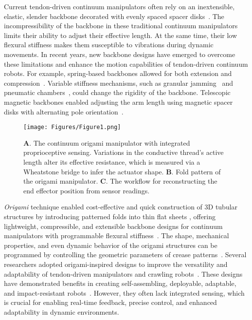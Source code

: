 \documentclass[journal, letterpaper]{IEEEtran}
\begin{document}
Current tendon-driven continuum manipulators often rely on an inextensible, elastic, slender backbone decorated with evenly spaced spacer disks~\cite{rao2021model,parvaresh2022dynamics}. The incompressibility of the backbone in these traditional continuum manipulators limits their ability to adjust their effective length. At the same time, their low flexural stiffness makes them susceptible to vibrations during dynamic movements.
In recent years, new backbone designs have emerged to overcome these limitations and enhance the motion capabilities of tendon-driven continuum robots. For example, spring-based backbones allowed for both extension and compression~\cite{li2018design}. Variable stiffness mechanisms, such as granular jamming~\cite{choi2021tendon} and pneumatic chambers~\cite{wockenfuss2022design}, could change the rigidity of the backbone.
Telescopic magnetic backbones enabled adjusting the arm length using magnetic spacer disks with alternating pole orientation~\cite{nguyen2015tendon}.

\begin{figure}[tb]
\centering
\texttt{[image: Figures/Figure1.png]}
\caption{\textbf{A}. The continuum origami manipulator with integrated proprioceptive sensing. Variations in the conductive thread's active length alter its effective resistance, which is measured via a Wheatstone bridge to infer the actuator shape. \textbf{B}. Fold pattern of the origami manipulator. \textbf{C}. The workflow for reconstructing the end effector position from sensor readings. }
\label{Fig1}
\end{figure}



\textit{Origami} technique enabled cost-effective and quick construction of 3D tubular structures by introducing patterned folds into thin flat sheets \cite{santoso2021origami}, offering lightweight, compressible, and extensible backbone designs for continuum manipulators with programmable flexural stiffness~\cite{son20224d}. 
The shape, mechanical properties, and even dynamic behavior of the origami structures can be programmed by controlling the geometric parameters of crease patterns~\cite{rus2018design,zhai2018origami}.
Several researchers adopted origami-inspired designs to improve the versatility and adaptability of tendon-driven manipulators and crawling robots~\cite{junfeng2024modular,yoo2023design,santoso2021origami,zhang2022design,zhang2023bioinspired,zhang2024origami, parvaresh2024metamaterial}. 
These designs have demonstrated benefits in creating self-assembling, deployable, adaptable, and impact-resistant robots~\cite{morgan2016approach}. However, they often lack integrated sensing, which is crucial for enabling real-time feedback, precise control, and enhanced adaptability in dynamic environments. 
\end{document}
